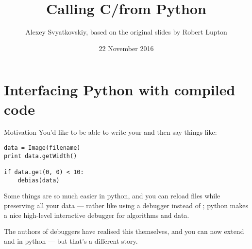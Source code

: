 \documentclass[10pt, t]{beamer}
\author{Alexey Svyatkovskiy, based on the original slides by Robert Lupton}
\date{22 November 2016}
\title{Calling C/\CPP from Python}
\let\texttt=\graytt
\begin{document}
\maketitle
\def\wrap{\_wrap}

\section*{Interfacing Python with compiled code}
\label{sec-1}

\begin{frame}[fragile,label=sec-1-1]{Motivation}
 You'd like to be able to write your \CPP and then say things like:
\lstset{language=Python,label= ,caption= ,numbers=none}
\begin{lstlisting}
data = Image(filename)
print data.getWidth()

if data.get(0, 0) < 10:
    debias(data)
\end{lstlisting}

\pause Some things are so much easier in python, and you can reload files while preserving all your data ---
rather like using a debugger instead of \texttt{printf}; python makes a nice high-level interactive debugger for
algorithms and data.

\pause
The authors of debuggers have realised this themselves, and you can now extend
\texttt{gdb} and \texttt{lldb} in python --- but that's a different story.
\end{frame}
\end{document}
